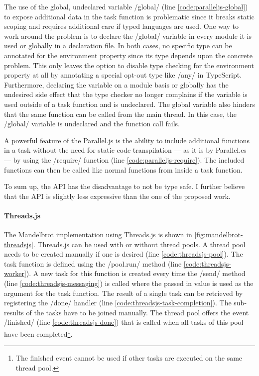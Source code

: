The use of the global, undeclared variable \javascriptinline/global/ (line \ref{code:paralleljs-global}) to expose additional data in the task function is problematic since it breaks static scoping and requires additional care if typed languages are used. One way to work around the problem is to declare the \javascriptinline/global/ variable in every module it is used or globally in a declaration file. In both cases, no specific type can be annotated for the environment property since its type depends upon the concrete problem. This only leaves the option to disable type checking for the environment property at all by annotating a special opt-out type like \javascriptinline/any/ in TypeScript. Furthermore, declaring the variable on a module basis or globally has the undesired side effect that the type checker no longer complains if the variable is used outside of a task function and is undeclared. The global variable also hinders that the same function can be called from the main thread. In this case, the \javascriptinline/global/ variable is undeclared and the function call fails.

A powerful feature of the Parallel.js is the ability to include additional functions in a task without the need for static code transpilation --- as it is by Parallel.es --- by using the \javascriptinline/require/ function (line \ref{code:paralleljs-require}). The included functions can then be called like normal functions from inside a task function. 

To sum up, the API has the disadvantage to not be type safe. I further believe that the API is slightly less expressive than the one of the proposed work.

\paragraph{Threads.js}
 The Mandelbrot implementation using Threads.js is shown in \cref{fig:mandelbrot-threadsjs}. Threads.js can be used with or without thread pools. A thread pool needs to be created manually if one is desired (line \ref{code:threadsjs-pool}). The task function is defined using the \javascriptinline/pool.run/ method (line \ref{code:threadsjs-worker}). A new task for this function is created every time the \javascriptinline/send/ method (line \ref{code:threadsjs-messaging}) is called where the passed in value is used as the argument for the task function. The result of a single task can be retrieved by registering the \javascriptinline/done/ handler (line \ref{code:threadsjs-task-completion}). The sub-results of the tasks have to be joined manually. The thread pool offers the event \javascriptinline/finished/ (line \ref{code:threadsjs-done}) that is called when all tasks of this pool have been completed\footnote{The finished event cannot be used if other tasks are executed on the same thread pool.}.


